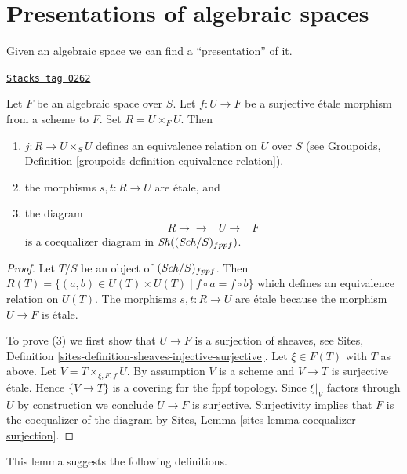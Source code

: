 \section{Presentations of algebraic spaces}
\label{spaces-section-presentations}
Given an algebraic space we can find a ``presentation'' of it.


\begin{lemma}
\label{spaces-lemma-space-presentation}
\href{https://stacks.math.columbia.edu/tag/0262}{\texttt{Stacks tag 0262}}

Let $F$ be an algebraic space over $S$. Let $f : U \to F$ be a
surjective \'etale morphism from a scheme to $F$. Set $R = U \times_F U$.
Then
\begin{enumerate}
\item $j : R \to U \times_S U$ defines an equivalence relation on
$U$ over $S$ (see
Groupoids, Definition \ref{groupoids-definition-equivalence-relation}).
\item the morphisms $s, t : R \to U$ are \'etale, and
\item the diagram
$$
\begin{array}{ccc}R \longrightarrow\longrightarrow & U \longrightarrow & F\end{array}
$$
is a coequalizer diagram in $\mathit{Sh}((\mathit{Sch}/S)_{fppf})$.
\end{enumerate}
\end{lemma}

\begin{proof}
Let $T/S$ be an object of $(\mathit{Sch}/S)_{fppf}$.
Then $R(T) = \{(a, b) \in U(T) \times U(T) \mid f \circ a = f \circ b\}$
which defines an equivalence relation on $U(T)$.
The morphisms $s, t : R \to U$ are \'etale because the morphism
$U \to F$ is \'etale.

\medskip\noindent
To prove (3) we first show that
$U \to F$ is a surjection of sheaves, see
Sites, Definition \ref{sites-definition-sheaves-injective-surjective}.
Let $\xi \in F(T)$ with $T$ as above. Let $V = T \times_{\xi, F, f}U$.
By assumption $V$ is a scheme and $V \to T$ is surjective \'etale.
Hence $\{V \to T\}$ is a covering for the fppf topology.
Since $\xi|_V$ factors through $U$ by construction we
conclude $U \to F$ is surjective. Surjectivity implies that
$F$ is the coequalizer of the diagram by
Sites, Lemma \ref{sites-lemma-coequalizer-surjection}.
\end{proof}

This lemma suggests the following definitions.

